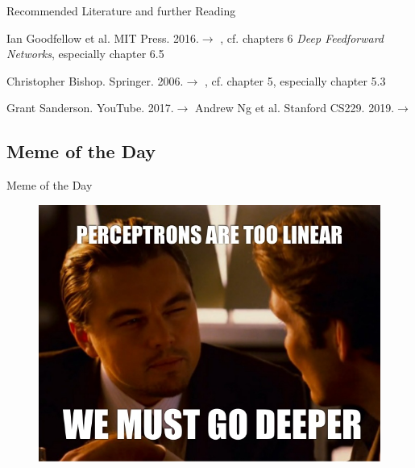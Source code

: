 \begin{frame}[allowframebreaks]{Recommended Literature and further Reading}{}
	\footnotesize
	\begin{thebibliography}{2}
			{Ian Goodfellow et al. MIT Press. 2016.}{$\rightarrow$ \href{
				http://www.deeplearningbook.org/
			}{}, cf. chapters 6 \textit{Deep Feedforward Networks}, especially chapter 6.5}
	
			{Christopher Bishop. Springer. 2006.}{$\rightarrow$ \href{
				http://users.isr.ist.utl.pt/~wurmd/Livros/school/Bishop\%20-\%20Pattern\%20Recognition\%20And\%20Machine\%20Learning\%20-\%20Springer\%20\%202006.pdf
			}{}, cf. chapter 5, especially chapter 5.3}

			{Grant Sanderson. YouTube. 2017.}{$\rightarrow$ \href{
				https://www.youtube.com/watch?v=tIeHLnjs5U8
			}{}}
			{Andrew Ng et al. Stanford CS229. 2019.}{$\rightarrow$ \href{
				http://cs229.stanford.edu/notes/backprop.py
			}{}}
	\end{thebibliography}
\end{frame}


\subsection{Meme of the Day}

\begin{frame}{Meme of the Day}{}
	\begin{figure}
		\includegraphics[scale=0.3]{10_deep_learning/02_img/meme_of_the_day}
	\end{figure}
\end{frame}


\makethanks

